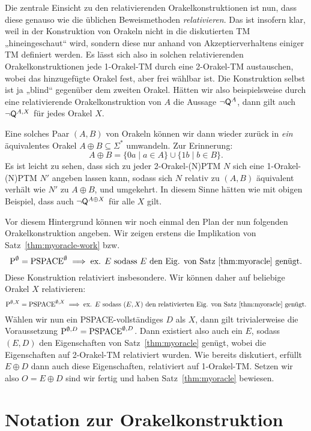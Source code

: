 Die zentrale Einsicht zu den relativierenden Orakelkonstruktionen ist nun, dass diese genauso wie die üblichen Beweismethoden \emph{relativieren}.
Das ist insofern klar, weil in der Konstruktion von Orakeln nicht in die diskutierten TM „hineingeschaut“ wird, sondern diese nur anhand von Akzeptierverhaltens einiger TM definiert werden.
Es lässt sich also in solchen relativierenden Orakelkonstruktionen jede 1-Orakel-TM durch eine 2-Orakel-TM austauschen, wobei das hinzugefügte Orakel fest, aber frei wählbar ist. Die Konstruktion selbst ist ja „blind“ gegenüber dem zweiten Orakel.
Hätten wir also beispielsweise durch eine relativierende Orakelkonstruktion von $A$ die Aussage $\neg\hQ^A$, dann gilt auch $\neg\hQ^{A,X}$ für jedes Orakel $X$.

Eine solches Paar $(A,B)$ von Orakeln können wir dann wieder zurück in \emph{ein} äquivalentes Orakel $A\oplus B\subseteq\Sigma^*$ umwandeln. Zur Erinnerung:
\[ A\oplus B = \{0a\mid a\in A\} \cup \{1b\mid b\in B\}. \]
Es ist leicht zu sehen, dass sich zu jeder 2-Orakel-(N)PTM $N$ sich eine 1-Orakel-(N)PTM $N'$ angeben lassen kann, sodass sich $N$ relativ zu $(A,B)$ äquivalent verhält wie $N'$ zu $A\oplus B$, und umgekehrt.
In diesem Sinne hätten wie mit obigen Beispiel, dass auch $\neg\hQ^{A\oplus X}$ für alle $X$ gilt.

Vor diesem Hintergrund können wir noch einmal den Plan der nun folgenden Orakelkonstruktion angeben.
Wir zeigen erstens die Implikation von Satz~\ref{thm:myoracle-work} bzw.
\[  \P^\emptyset =\mathrm{PSPACE}^\emptyset \implies \text{ex. $E$ sodass $E$ den Eig. von Satz~\ref{thm:myoracle} genügt.}  \]
Diese Konstruktion relativiert insbesondere. Wir können daher auf beliebige Orakel $X$ relativieren:
\[  \P^{\emptyset,X} =\mathrm{PSPACE}^{\emptyset,X} \implies \text{ex. $E$ sodass $(E, X)$ den relativierten Eig. von Satz~\ref{thm:myoracle} genügt.}  \]
Wählen wir nun ein PSPACE-vollständiges $D$ als $X$, dann gilt trivialerweise die Voraussetzung $\P^{\emptyset,D}=\PSPACE^{\emptyset,D}$. Dann existiert also auch ein $E$, sodass $(E,D)$ den Eigenschaften von Satz~\ref{thm:myoracle} genügt, wobei die Eigenschaften auf 2-Orakel-TM relativiert wurden.
Wie bereits diskutiert, erfüllt $E\oplus D$ dann auch diese Eigenschaften, relativiert auf 1-Orakel-TM.
Setzen wir also $O=E\oplus D$ sind wir fertig und haben Satz~\ref{thm:myoracle} bewiesen.







\section{Notation zur Orakelkonstruktion}\label{sec:oracle-notation}

